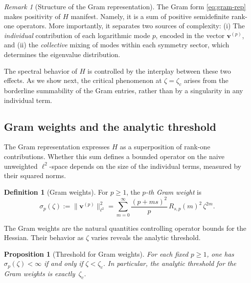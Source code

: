 \documentclass[11pt]{amsart}
\numberwithin{equation}{section}
\theoremstyle{plain}
\newtheorem{proposition}[theorem]{Proposition}
\theoremstyle{definition}
\newtheorem{definition}[theorem]{Definition}
\theoremstyle{remark}
\newtheorem{remark}[theorem]{Remark}
\begin{document}
\begin{remark}[Structure of the Gram representation]
	\label{rem:gram-structure}
	The Gram form \eqref{eq:gram-rep} makes positivity of $H$ manifest. Namely, it is a
	sum of positive semidefinite rank-one operators. More importantly, it
	separates two sources of complexity: (i) The \emph{individual} contribution of each logarithmic mode $p$,
	encoded in the vector $\bm{v}^{(p)}$, and (ii) the \emph{collective} mixing of modes within each symmetry sector,
	which determines the eigenvalue distribution.

	The spectral behavior of $H$ is controlled by the interplay between these
	two effects. As we show next, the critical phenomenon at $\zeta = \zeta_c$
	arises from the borderline summability of the Gram entries, rather than by a singularity in any individual term.
\end{remark}


\subsection{Gram weights and the analytic threshold}
\label{subsec:gram-weights}

The Gram representation expresses $H$ as a superposition of rank-one
contributions. Whether this sum defines a bounded operator on the naive
unweighted $\ell^2$-space depends on the size of the individual terms,
measured by their squared norms.


\begin{definition}[Gram weights]
	\label{def:gram-weights}
	For $p \ge 1$, the \emph{$p$-th Gram weight} is
	\begin{equation}\label{eq:gram-weight-def}
		\sigma_p(\zeta) := \|\bm{v}^{(p)}\|_{\ell^2}^2
		= \sum_{m=0}^{\infty} \frac{(p+ms)^2}{p} \, R_{s,p}(m)^2 \, \zeta^{2m}.
	\end{equation}
\end{definition}

The Gram weights are the natural quantities controlling operator bounds for
the Hessian. Their behavior as $\zeta$ varies reveals the analytic threshold.

\begin{proposition}[Threshold for Gram weights]
	\label{prop:gram-divergence}
	For each fixed $p \ge 1$, one has $\sigma_p(\zeta) < \infty$ if and only if
	$\zeta < \zeta_c$. In particular, the analytic threshold for the Gram weights is exactly~$\zeta_c$.
\end{proposition}
\end{document}
